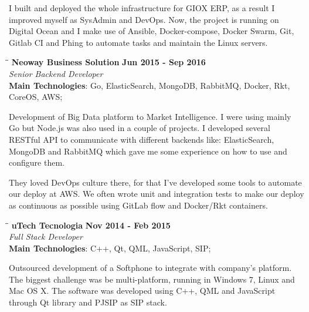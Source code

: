 \documentclass[margin]{res}
\begin{document}
\begin{resume}
I built and deployed the whole infrastructure for GIOX ERP, as a result I improved myself as SysAdmin and DevOps. Now, the project is running on Digital Ocean and I make use of Ansible, Docker-compose, Docker Swarm, Git, Gitlab CI and Phing to automate tasks and maintain the Linux servers.

\vspace{-0.1in}
    \begin{tabbing}
    \hspace{2.3in}\= \hspace{1.7in}\= \kill %
    \textbf{Neoway Business Solution}    \>\>\textbf{Jun 2015 - Sep 2016}\\
    \textit{Senior Backend Developer}\\
    \textbf{Main Technologies}: Go, ElasticSearch, MongoDB, RabbitMQ, Docker, Rkt,\\CoreOS, AWS;
    \end{tabbing}\vspace{-20pt}      %
    \vspace{2mm}
Development of Big Data platform to Market Intelligence. I were using mainly Go but Node.js was also used in a couple of projects. I developed several RESTful API to communicate with different backends like: ElasticSearch, MongoDB and RabbitMQ which gave me some experience on how to use and configure them.

They loved DevOps culture there, for that I've developed some tools to automate our deploy at AWS. We often wrote unit and integration tests to make our deploy as continuous as possible using GitLab flow and Docker/Rkt containers.

\vspace{-0.1in}
    \begin{tabbing}
    \hspace{2.3in}\= \hspace{1.7in}\= \kill
    \textbf{uTech Tecnologia}    \>\>\textbf{Nov 2014 - Feb 2015}\\
    \textit{Full Stack Developer}\\
    \textbf{Main Technologies}: C++, Qt, QML, JavaScript, SIP;
    \end{tabbing}\vspace{-20pt}
    \vspace{2mm}
Outsourced development of a Softphone to integrate with company’s platform. The biggest challenge was be multi-platform, running in Windows 7, Linux and Mac OS X. The software was developed using C++, QML and JavaScript through Qt library and PJSIP as SIP stack.


\end{resume}
\end{document}
